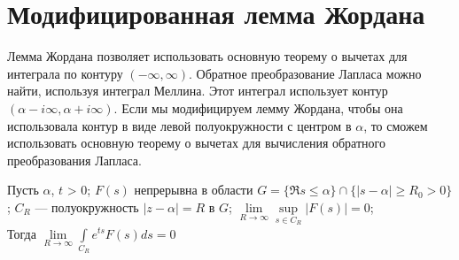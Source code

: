 \section {Модифицированная лемма Жордана}
Лемма Жордана позволяет использовать основную теорему о вычетах для интеграла по контуру $(-\infty, \infty)$.
Обратное преобразование Лапласа можно найти, используя интеграл Меллина. Этот интеграл использует контур $(\alpha - i\infty, \alpha + i\infty)$.
Если мы модифицируем лемму Жордана, чтобы она использовала контур в виде левой полуокружности с центром в $\alpha$, то сможем использовать основную теорему о вычетах для вычисления обратного преобразования Лапласа.
%
\begin{Th*} $ $ \\
    Пусть $\alpha$, $t$ > 0; 
    $F(s)$ непрерывна в области $G = \{\Re s \le  \alpha \} \cap \{ |s-\alpha| \ge  R_0 > 0 \}$;
	$C_R$ --- полуокружность $|z-\alpha| = R$ в $G$;
	$\lim\limits_{R \to \infty} \sup\limits_{s \in C_R} |F(s)| = 0$; \\
    Тогда $\lim\limits_{R \to \infty} \int\limits_{C_R} e^{ts} F(s)ds = 0$
\end{Th*}
